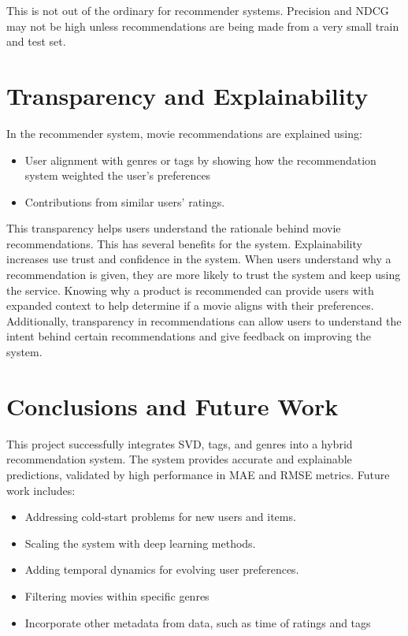 \documentclass[nonacm, sigconf]{acmart}
\begin{document}
This is not out of the ordinary for recommender systems. Precision and NDCG may not be high unless recommendations are being made from a very small train and test set.

\section{Transparency and Explainability}
In the recommender system, movie recommendations are explained using:

\begin{itemize}
    \item User alignment with genres or tags by showing how the recommendation system weighted the user's preferences
    \item Contributions from similar users' ratings.
\end{itemize}

This transparency helps users understand the rationale behind movie recommendations. This has several benefits for the system. Explainability increases use trust and confidence in the system. When users understand why a recommendation is given, they are more likely to trust the system and keep using the service. Knowing why a product is recommended can provide users with expanded context to help determine if a movie aligns with their preferences. Additionally, transparency in recommendations can allow users to understand the intent behind certain recommendations and give feedback on improving the system.

\section{Conclusions and Future Work}
This project successfully integrates SVD, tags, and genres into a hybrid recommendation system. The system provides accurate and explainable predictions, validated by high performance in MAE and RMSE metrics. Future work includes:
\begin{itemize}
    \item Addressing cold-start problems for new users and items.
    \item Scaling the system with deep learning methods.
    \item Adding temporal dynamics for evolving user preferences.
    \item Filtering movies within specific genres
    \item Incorporate other metadata from data, such as time of ratings and tags

\end{itemize}



\end{document}
